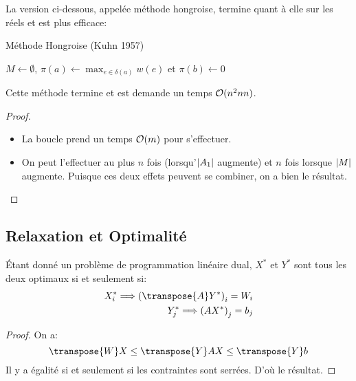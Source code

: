 \documentclass[math, info]{cours}
\begin{document}
La version ci-dessous, appelée méthode hongroise, termine quant à elle sur les réels et est plus efficace:
\begin{algorithm}
	\caption{Méthode Hongroise (Kuhn 1957)}
	\begin{algorithmic}
		\State $M \gets \emptyset$, $\displaystyle\pi(a) \gets \max_{e \in \delta(a)} w(e)$ et $\pi(b) \gets 0$
		\EndIf
		\EndWhile
	\end{algorithmic}
\end{algorithm}

\begin{thm}
	Cette méthode termine et est demande un temps $\mathcal{O}(n^{2}nn)$.
\end{thm}
\begin{proof}
	\begin{itemize}
		\item La boucle prend un temps $\mathcal{O}(m)$ pour s'effectuer.
		\item On peut l'effectuer au plus $n$ fois (lorsqu'$\left|A_{1}\right|$ augmente) et $n$ fois lorsque $\left|M\right|$ augmente.
		      Puisque ces deux effets peuvent se combiner, on a bien le résultat.
	\end{itemize}
\end{proof}

\subsection{Relaxation et Optimalité}
\begin{proposition}[Relaxation]
	Étant donné un problème de programmation linéaire dual, $X^{*}$ et $Y^{*}$ sont tous les deux optimaux si et seulement si:
	\begin{align*}
		X_{i}^{*} \Longrightarrow \left(\transpose{A}Y^{*}\right)_{i} = W_{i} \\
		Y_{j}^{*} \Longrightarrow \left(AX^{*}\right)_{j} = b_{j}
	\end{align*}
	\label{prop:relaxation}
\end{proposition}
\begin{proof}
	On a:
	\begin{equation*}
		\transpose{W}X \leq \transpose{Y}AX \leq \transpose{Y}b
	\end{equation*}
	Il y a égalité si et seulement si les contraintes sont serrées.
	D'où le résultat.
\end{proof}
\end{document}

